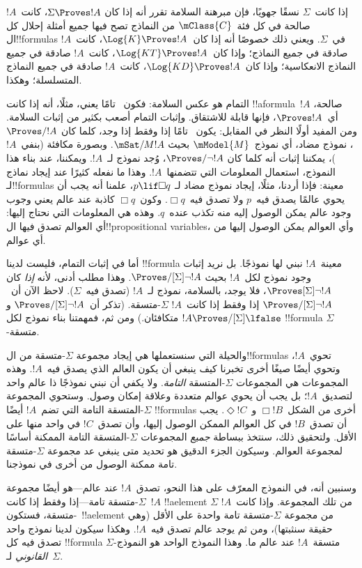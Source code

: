 \documentclass[../../../include/open-logic-section]{subfiles}
\begin{document}


إذا كانت~$\Sigma$ نسقًا جهويًا، فإن مبرهنة السلامة تقرر أنه إذا كان
$\Sigma \Proves !A$، كانت~$!A$ صالحة في كل فئة~$\mClass{C}$ من
النماذج تصح فيها جميع أمثلة إحلال كل ال!!{formula}s في~$\Sigma$.
ويعني ذلك خصوصًا أنه إذا كان~$\Log{K} \Proves !A$، كانت~$!A$ صادقة
في جميع النماذج؛ وإذا كان~$\Log{KT} \Proves !A$، كانت~$!A$ صادقة في
جميع النماذج الانعكاسية؛ وإذا كان~$\Log{KD} \Proves !A$، كانت~$!A$
صادقة في جميع النماذج المتسلسلة؛ وهكذا.

التمام هو عكس السلامة: فكون~ تامًا يعني، مثلًا، أنه إذا كانت
!!a{formula}~$!A$ صالحة، أي~$\Proves !A$، فإنها قابلة للاشتقاق.
وإثبات التمام أصعب بكثير من إثبات السلامة. ومن المفيد أولًا النظر في
المقابل: يكون~ تامًا إذا وفقط إذا وجد، كلما كان
$\Proves/ !A$، نموذج مضاد، أي نموذج~$\mModel{M}$ بحيث
$\mSat/{M}{!A}$. وبصورة مكافئة (بنفي~$!A$)، يمكننا إثبات أنه كلما كان
$\Proves/ \lnot !A$، وُجد نموذج لـ~$!A$. ويمكننا، عند بناء هذا النموذج،
استعمال المعلومات التي تتضمنها~$!A$. وهذا ما نفعله كثيرًا عند إيجاد
نماذج لـ!!{formula}s معينة: فإذا أردنا، مثلًا، إيجاد نموذج مضاد لـ
$p \lif \Box q$، علمنا أنه يجب أن يحوي عالمًا يصدق فيه~$p$ ولا تصدق
فيه~$\Box q$. وكون~$\Box q$ كاذبة عند عالم يعني وجوب وجود عالم يمكن
الوصول إليه منه تكذب عنده~$q$. وهذه هي المعلومات التي نحتاج إليها:
أي العوالم تصدق فيها ال!!{propositional variable}s، وأي العوالم يمكن
الوصول إليها من أي عوالم.

أما في إثبات التمام، فليست لدينا !!{formula} معينة~$!A$ نبني لها
نموذجًا. بل نريد إثبات وجود نموذج لكل~$!A$ بحيث
$\Proves/[\Sigma] \lnot !A$. وهذا مطلب أدنى، لأنه \emph{إذا} كان
$\Proves[\Sigma] \lnot !A$، فلا يوجد، بالسلامة، نموذج لـ~$!A$ (تصدق
فيه~$\Sigma$). لاحظ الآن أن~$\Proves/[\Sigma] \lnot !A$ إذا وفقط إذا
كانت~$!A$ $\Sigma$-متسقة. (تذكر أن~$\Proves/[\Sigma] \lnot !A$ و
$!A \Proves/[\Sigma] \lfalse$ متكافئان.) ومن ثم، فمهمتنا بناء نموذج
لكل !!{formula} $\Sigma$-متسقة.

والحيلة التي سنستعملها هي إيجاد مجموعة $\Sigma$-متسقة من
ال!!{formula}s تحوي~$!A$، وتحوي أيضًا صيغًا أخرى تخبرنا كيف ينبغي أن
يكون العالم الذي يصدق فيه~$!A$. وهذه المجموعات هي المجموعات
$\Sigma$-المتسقة \emph{التامة}. ولا يكفي أن نبني نموذجًا ذا عالم واحد
لتصديق~$!A$؛ بل يجب أن يحوي عوالم متعددة وعلاقة إمكان وصول. وستحوي
المجموعة $\Sigma$-المتسقة التامة التي تضم~$!A$ أيضًا !!{formula}s أخرى
من الشكل~$\Box !B$ و~$\Diamond !C$. يجب أن تصدق~$!B$ في كل العوالم
الممكن الوصول إليها، وأن تصدق~$!C$ في واحد منها على الأقل. ولتحقيق
ذلك، سنتخذ ببساطة \emph{جميع} المجموعات $\Sigma$-المتسقة التامة
الممكنة أساسًا لمجموعة العوالم. وسيكون الجزء الدقيق هو تحديد متى ينبغي
عد مجموعة $\Sigma$-متسقة تامة ممكنة الوصول من أخرى في نموذجنا.

وسنبين أنه، في النموذج المعرّف على هذا النحو، تصدق~$!A$ عند عالم---هو
أيضًا مجموعة $\Sigma$-متسقة تامة---إذا وفقط إذا كانت~$!A$ !!a{element}
من تلك المجموعة. وإذا كانت~$!A$ $\Sigma$-متسقة، فستكون~!!a{element}
من مجموعة $\Sigma$-متسقة تامة واحدة على الأقل (وهي حقيقة سنثبتها)،
ومن ثم يوجد عالم تصدق فيه~$!A$. وهكذا سيكون لدينا نموذج واحد تصدق فيه
كل !!{formula} $\Sigma$-متسقة~$!A$ عند عالم ما. وهذا النموذج الواحد هو
النموذج \emph{القانوني} لـ~$\Sigma$.
\end{document}
